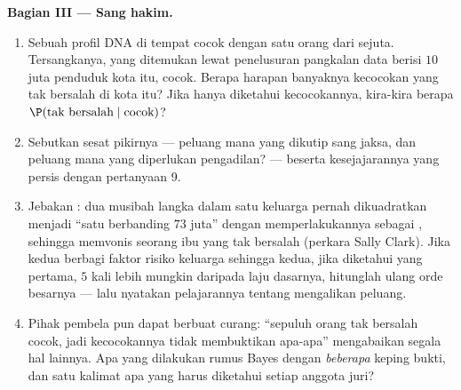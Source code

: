 \begin{problem}
\medskip
\noindent\textbf{Bagian III --- Sang hakim.}
\begin{enumerate}[resume]
  \item Sebuah profil DNA di tempat  cocok dengan satu orang dari
        sejuta. Tersangkanya, yang ditemukan lewat penelusuran pangkalan data
        berisi $10$ juta penduduk kota itu, cocok. Berapa harapan
        banyaknya kecocokan yang tak bersalah di kota itu? Jika hanya diketahui
        kecocokannya, kira-kira berapa $\P(\text{tak bersalah} \mid
        \text{cocok})$?
  \item Sebutkan sesat pikirnya --- peluang mana yang dikutip
        sang jaksa, dan peluang mana yang diperlukan pengadilan? ---
        beserta kesejajarannya yang persis dengan pertanyaan 9.
  \item Jebakan : dua musibah langka dalam satu keluarga
        pernah dikuadratkan menjadi ``satu berbanding $73$ juta'' dengan
        memperlakukannya sebagai , sehingga memvonis seorang ibu
        yang tak bersalah (perkara Sally Clark). Jika kedua  berbagi
        faktor risiko keluarga sehingga  kedua, jika diketahui yang
        pertama, $5$ kali lebih mungkin daripada laju dasarnya,
        hitunglah ulang orde besarnya --- lalu nyatakan
        pelajarannya tentang mengalikan peluang.
  \item Pihak pembela pun dapat berbuat curang: ``sepuluh orang tak bersalah cocok, jadi
        kecocokannya tidak membuktikan apa-apa'' mengabaikan segala hal lainnya.
        Apa yang dilakukan rumus Bayes dengan \emph{beberapa} keping
        bukti, dan satu kalimat apa yang harus diketahui setiap
        anggota juri?
\end{enumerate}


\end{problem}

